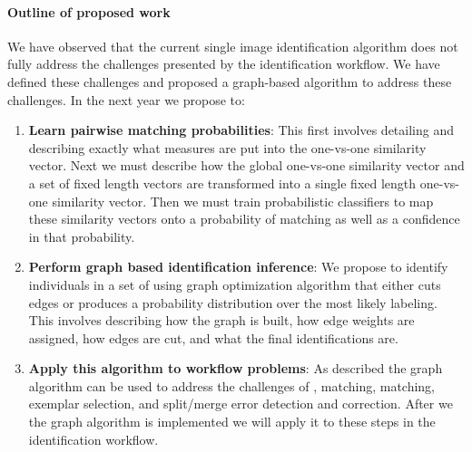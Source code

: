     \paragraph{Outline of proposed work}
    We have observed that the current single image identification algorithm
      does not fully address the challenges presented by the identification
      workflow.
    We have defined these challenges and proposed a graph-based algorithm to
      address these challenges.
    In the next year we propose to:
    \begin{enumerate}

        \item \textbf{Learn pairwise matching probabilities}:
            This first involves detailing and describing exactly what measures
              are put into the one-vs-one similarity vector.
            Next we must describe how the global one-vs-one similarity vector
              and a set of fixed length vectors are transformed into a single
              fixed length one-vs-one similarity vector.
            Then we must train probabilistic classifiers to map these
              similarity vectors onto a probability of matching as well as a
              confidence in that probability.

        \item \textbf{Perform graph based identification inference}:
            We propose to identify individuals in a set of \annots{} using
              graph optimization algorithm that either cuts edges or produces a
              probability distribution over the most likely \annot{} labeling.
            This involves describing how the graph is built, how edge weights
              are assigned, how edges are cut, and what the final
              identifications are.

        \item \textbf{Apply this algorithm to workflow problems}:
            As described the graph algorithm can be used to address the
              challenges of \intraoccurrence{}, matching, \vsexemplar{}
              matching, exemplar selection, and split/merge error detection and
              correction.
            After we the graph algorithm is implemented we will apply it to
              these steps in the identification workflow.
    \end{enumerate}
